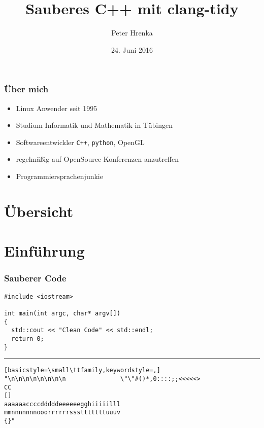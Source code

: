 \documentclass[aspectratio=169]{beamer}
\title{Sauberes C++ mit clang-tidy}
\institute{Linux Tag Tübingen 2017}
\author{Peter Hrenka}
\date{24. Juni 2016}
\begin{document}
\begin{frame}
\titlepage
\end{frame}
\begin{frame}
  \frametitle{Über mich}
  \begin{itemize}
    \item Linux Anwender seit 1995
    \item Studium Informatik und Mathematik in Tübingen
    \item Softwareentwickler \texttt{C++}, \texttt{python}, OpenGL
    \item regelmäßig auf OpenSource Konferenzen anzutreffen
    \item Programmiersprachenjunkie
  \end{itemize}
\end{frame}
\section*{Übersicht}
\begin{frame}
  \tableofcontents
\end{frame}
\section{Einführung}
\begin{frame}[fragile]
  \frametitle{Sauberer Code}
  \begin{lstlisting}[basicstyle=\small\ttfamily,keywordstyle=\color{blue},]
#include <iostream>

int main(int argc, char* argv[])
{
  std::cout << "Clean Code" << std::endl;
  return 0;
}
\end{lstlisting}
\pause
\hrule
\begin{lstlisting}[basicstyle=\small\ttfamily,keywordstyle=,]
"\n\n\n\n\n\n\n\n               \"\"#()*,0::::;;<<<<<>
CC
[]
aaaaaaccccdddddeeeeeegghiiiiilll
mmnnnnnnnooorrrrrrssstttttttuuuv
{}"
\end{lstlisting}
\end{frame}
\end{document}
